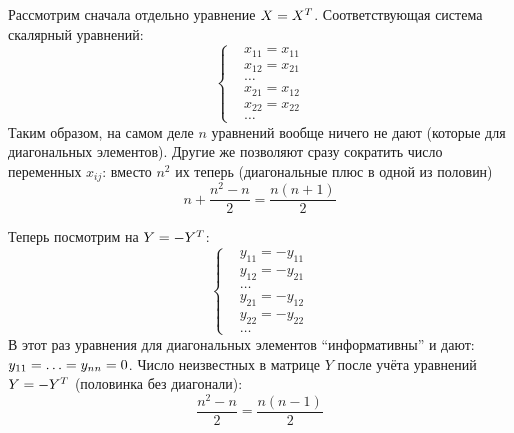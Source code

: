 \documentclass[a4paper,12pt]{article}
\begin{document}
\begin{solution}
    Рассмотрим сначала отдельно уравнение $X \hm= X^T$.
    Соответствующая система скалярный уравнений:
    \[
      \left\{
        \begin{aligned}
          &x_{11} = x_{11}\\
          &x_{12} = x_{21}\\
          &\ldots\\
          &x_{21} = x_{12}\\
          &x_{22} = x_{22}\\
          &\ldots
        \end{aligned}
      \right.
    \]
    Таким образом, на самом деле $n$ уравнений вообще ничего не дают (которые для диагональных элементов).
    Другие же позволяют сразу сократить число переменных $x_{ij}$: вместо $n^2$ их теперь (диагональные плюс в одной из половин)
    \[
      n + \frac{n^2 - n}{2} = \frac{n (n + 1)}{2}
    \]
    
    Теперь посмотрим на $Y \hm= -Y^T$:
    \[
      \left\{
        \begin{aligned}
          &y_{11} = -y_{11}\\
          &y_{12} = -y_{21}\\
          &\ldots\\
          &y_{21} = -y_{12}\\
          &y_{22} = -y_{22}\\
          &\ldots
        \end{aligned}
      \right.
    \]
    В этот раз уравнения для диагональных элементов ``информативны'' и дают: $y_{11} \hm= \ldots \hm= y_{nn} \hm= 0$.
    Число неизвестных в матрице $Y$ после учёта уравнений $Y \hm= -Y^T$ (половинка без диагонали):
    \[
      \frac{n^2 - n}{2} = \frac{n (n - 1)}{2}
    \]
    

\end{solution}
\end{document}

